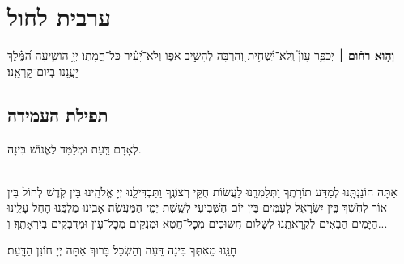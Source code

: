 \chapter[ערבית לחול]{ ערבית לחול }

\textbf{וְה֤וּא רַח֨וּם}
׀ יְכַפֵּ֥ר עָוֺן֮ וְֽלֹא־יַֽ֫שְׁחִ֥ית וְ֭הִרְבָּה לְהָשִׁ֣יב אַפּ֑וֹ וְלֹא־יָ֝עִ֗יר כׇּל־חֲמָתֽוֹ׃
יְיָ֥ הוֹשִׁ֑יעָה הַ֝מֶּ֗לֶךְ יַעֲנֵ֥נוּ בְיוֹם־קׇרְאֵֽנוּ׃


\barachu


\hamaarivaravim

\ahavasolam

\shema

\veahavta

\vehaya

\vayomer{}

\emesveemuna


\boruchhashemleolam

\halfkaddish

\section[תפילת העמידה]{ תפילת העמידה }


\amidaopening{\ayt}{}

לְאָדָם דַּֽעַת וּמְלַמֵּד לֶאֱנוֹשׁ בִּינָה.

\begin{sometimes}

\\
אַתָּה חוֹנַנְתָּֽנוּ לְמַדַּע תּוֹרָתֶֽךָ וַתְּלַמְּדֵֽנוּ לַעֲשׂוֹת חֻקֵּי רְצוֹנֶֽךָ וַתַּבְדִּילֵֽנוּ יְיָ אֱלֹהֵֽינוּ בֵּין קֹֽדֶשׁ לְחוֹל בֵּין אוֹר לְחֹֽשֶׁךְ בֵּין יִשְׂרָאֵל לָעַמִּים בֵּין יוֹם הַשְּׁבִיעִי לְשֵֽׁשֶׁת יְמֵי הַמַּעֲשֶׂה׃ אָבִֽינוּ מַלְכֵּֽנוּ הָחֵל עָלֵֽינוּ הַיָּמִים הַבָּאִים לִקְרָאתֵֽנוּ לְשָׁלוֹם חֲשׂוּכִים מִכׇּל־חֵטְא וּמְנֻקִּים מִכׇּל־עָוֹן וּמְדֻבָּקִים בְּיִרְאָתֶֽךָ׃ וְ...

\end{sometimes}

חׇנֵּֽנוּ מֵאִתְּךָ בִּינָה דֵּעָה וְהַשְׂכֵּל׃ בָּרוּךְ אַתָּה יְיָ חוֹנֵן הַדָּֽעַת׃

\weekdaysateshuva

\weekdaysaselichah

\weekdaysageulah

\weekdaysarefuah

\weekdaysaberacha

